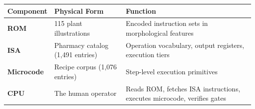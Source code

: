 \documentclass[12pt,a4paper]{article}
\begin{document}
\begin{longtable}[]{@{}lll@{}}
\toprule
\begin{minipage}[b]{0.29\columnwidth}\raggedright
Component\strut
\end{minipage} & \begin{minipage}[b]{0.37\columnwidth}\raggedright
Physical Form\strut
\end{minipage} & \begin{minipage}[b]{0.26\columnwidth}\raggedright
Function\strut
\end{minipage}\tabularnewline
\midrule
\endhead
\begin{minipage}[t]{0.29\columnwidth}\raggedright
\textbf{ROM}\strut
\end{minipage} & \begin{minipage}[t]{0.37\columnwidth}\raggedright
115 plant illustrations\strut
\end{minipage} & \begin{minipage}[t]{0.26\columnwidth}\raggedright
Encoded instruction sets in morphological features\strut
\end{minipage}\tabularnewline
\begin{minipage}[t]{0.29\columnwidth}\raggedright
\textbf{ISA}\strut
\end{minipage} & \begin{minipage}[t]{0.37\columnwidth}\raggedright
Pharmacy catalog (1,491 entries)\strut
\end{minipage} & \begin{minipage}[t]{0.26\columnwidth}\raggedright
Operation vocabulary, output registers, execution tiers\strut
\end{minipage}\tabularnewline
\begin{minipage}[t]{0.29\columnwidth}\raggedright
\textbf{Microcode}\strut
\end{minipage} & \begin{minipage}[t]{0.37\columnwidth}\raggedright
Recipe corpus (1,076 entries)\strut
\end{minipage} & \begin{minipage}[t]{0.26\columnwidth}\raggedright
Step-level execution primitives\strut
\end{minipage}\tabularnewline
\begin{minipage}[t]{0.29\columnwidth}\raggedright
\textbf{CPU}\strut
\end{minipage} & \begin{minipage}[t]{0.37\columnwidth}\raggedright
The human operator\strut
\end{minipage} & \begin{minipage}[t]{0.26\columnwidth}\raggedright
Reads ROM, fetches ISA instructions, executes microcode, verifies
gates\strut
\end{minipage}\tabularnewline
\bottomrule
\end{longtable}
\end{document}
